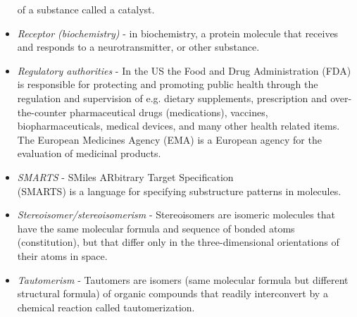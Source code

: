 \documentclass{../sig-alternate}
\begin{document}
\begin{itemize}
    of a substance called a catalyst.
\item \textit{Receptor (biochemistry)} - in biochemistry, a protein molecule that receives and responds to a
    neurotransmitter, or other substance.
\item \textit{Regulatory authorities} - In the US the Food and Drug Administration (FDA) is responsible for
    protecting and promoting public health through the regulation and supervision of e.g. dietary supplements,
    prescription and over-the-counter pharmaceutical drugs (medications), vaccines, biopharmaceuticals, medical
    devices, and many other health related items. The European Medicines Agency (EMA) is a European agency for the
    evaluation of medicinal products.
\item \textit{SMARTS} - SMiles ARbitrary Target Specification \\(SMARTS) is a language for specifying substructure
    patterns in molecules.
\item \textit{Stereoisomer/stereoisomerism} - Stereoisomers are isomeric molecules that have the same molecular
    formula and sequence of bonded atoms (constitution), but that differ only in the three-dimensional orientations
    of their atoms in space.
\item \textit{Tautomerism} - Tautomers are isomers (same molecular formula but different structural formula) of
    organic compounds that readily interconvert by a chemical reaction called tautomerization.
\end{itemize}
%
\end{document}
